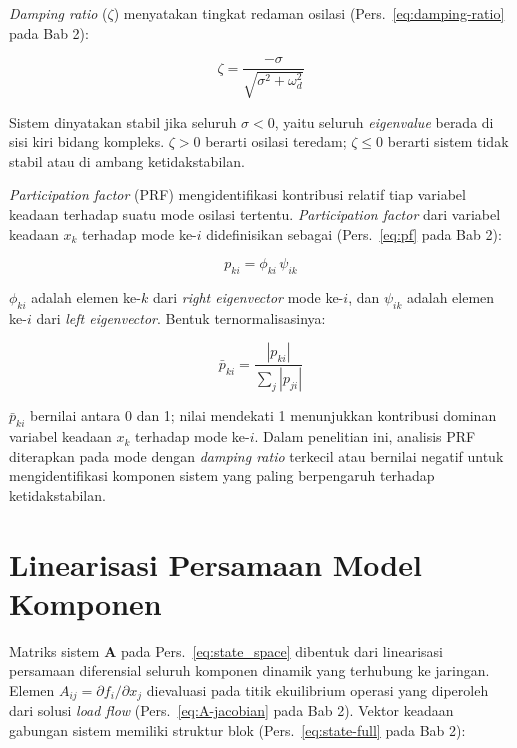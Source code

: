 \textit{Damping ratio} ($\zeta$) menyatakan tingkat redaman osilasi
(Pers.~\ref{eq:damping-ratio} pada Bab 2):

\begin{equation}
    \zeta = \frac{-\sigma}{\sqrt{\sigma^2 + \omega_d^2}}
    \label{eq:damping_ratio}
\end{equation}

Sistem dinyatakan stabil jika seluruh $\sigma < 0$, yaitu seluruh
\textit{eigenvalue} berada di sisi kiri bidang kompleks. $\zeta > 0$ berarti
osilasi teredam; $\zeta \leq 0$ berarti sistem tidak stabil atau di ambang
ketidakstabilan.

\textit{Participation factor} (PRF) mengidentifikasi kontribusi relatif tiap
variabel keadaan terhadap suatu mode osilasi tertentu. \textit{Participation
factor} dari variabel keadaan $x_k$ terhadap mode ke-$i$ didefinisikan sebagai
(Pers.~\ref{eq:pf} pada Bab 2):

\begin{equation}
    p_{ki} = \phi_{ki}\,\psi_{ik}
    \label{eq:prf}
\end{equation}

\noindent $\phi_{ki}$ adalah elemen ke-$k$ dari \textit{right eigenvector} mode
ke-$i$, dan $\psi_{ik}$ adalah elemen ke-$i$ dari \textit{left eigenvector}.
Bentuk ternormalisasinya:

\begin{equation}
    \bar{p}_{ki} = \frac{|p_{ki}|}{\displaystyle\sum_{j}|p_{ji}|}
    \label{eq:prf_norm}
\end{equation}

$\bar{p}_{ki}$ bernilai antara 0 dan 1; nilai mendekati 1 menunjukkan
kontribusi dominan variabel keadaan $x_k$ terhadap mode ke-$i$. Dalam
penelitian ini, analisis PRF diterapkan pada mode dengan \textit{damping ratio}
terkecil atau bernilai negatif untuk mengidentifikasi komponen sistem yang
paling berpengaruh terhadap ketidakstabilan.

\section{Linearisasi Persamaan Model Komponen}

Matriks sistem $\mathbf{A}$ pada Pers.~\eqref{eq:state_space} dibentuk dari
linearisasi persamaan diferensial seluruh komponen dinamik yang terhubung ke
jaringan. Elemen $A_{ij} = \partial f_i/\partial x_j$ dievaluasi pada titik
ekuilibrium operasi yang diperoleh dari solusi \textit{load flow}
(Pers.~\ref{eq:A-jacobian} pada Bab 2). Vektor keadaan gabungan sistem memiliki
struktur blok (Pers.~\ref{eq:state-full} pada Bab 2):

